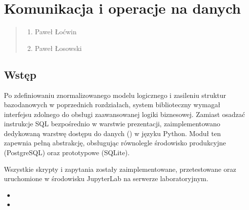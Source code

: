\documentclass[a4paper,11pt,english,openany,oneside]{sphinxmanual}
\begin{document}
\sphinxstepscope


\chapter{Komunikacja i operacje na danych}
\label{\detokenize{rozdzial_5/index:komunikacja-i-operacje-na-danych}}\label{\detokenize{rozdzial_5/index::doc}}\begin{quote}\begin{description}
\begin{enumerate}
%
\item {} 
\sphinxAtStartPar
Paweł Łoćwin

\item {} 
\sphinxAtStartPar
Paweł Łosowski

\end{enumerate}

\end{description}\end{quote}


\section{Wstęp}
\label{\detokenize{rozdzial_5/index:wstep}}
\sphinxAtStartPar
Po zdefiniowaniu znormalizowanego modelu logicznego i zasileniu struktur bazodanowych w poprzednich rozdziałach, system biblioteczny wymagał interfejsu zdolnego do obsługi zaawansowanej logiki biznesowej. Zamiast osadzać instrukcje SQL bezpośrednio w warstwie prezentacji, zaimplementowano dedykowaną warstwę dostępu do danych () w języku Python. Moduł ten zapewnia pełną abstrakcję, obsługując równolegle środowisko produkcyjne (PostgreSQL) oraz prototypowe (SQLite).

\sphinxAtStartPar
Wszystkie skrypty i zapytania zostały zaimplementowane, przetestowane oraz uruchomione w środowisku JupyterLab na serwerze laboratoryjnym.
\begin{itemize}
\item {} 
\sphinxAtStartPar
{} 

\item {} 
\sphinxAtStartPar
{} %
\begin{footnote}[9]\sphinxAtStartFootnote
{}
%
\end{footnote}

\end{itemize}
\end{document}
